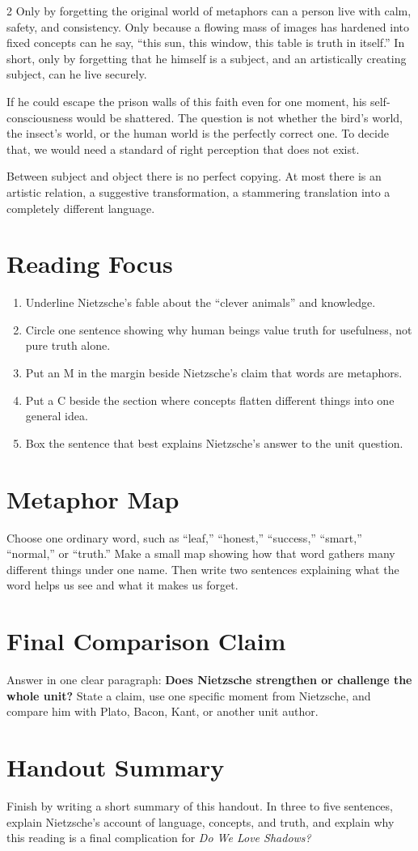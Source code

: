 \documentclass[12pt]{article}
\begin{document}
\begin{multicols}{2}
Only by forgetting the original world of metaphors can a person live with calm, safety, and consistency. Only because a flowing mass of images has hardened into fixed concepts can he say, ``this sun, this window, this table is truth in itself.'' In short, only by forgetting that he himself is a subject, and an artistically creating subject, can he live securely.

If he could escape the prison walls of this faith even for one moment, his self-consciousness would be shattered. The question is not whether the bird's world, the insect's world, or the human world is the perfectly correct one. To decide that, we would need a standard of right perception that does not exist.

Between subject and object there is no perfect copying. At most there is an artistic relation, a suggestive transformation, a stammering translation into a completely different language.

\section*{Reading Focus}
\begin{enumerate}[leftmargin=*, itemsep=0.2em]
\item Underline Nietzsche's fable about the ``clever animals'' and knowledge.
\item Circle one sentence showing why human beings value truth for usefulness, not pure truth alone.
\item Put an M in the margin beside Nietzsche's claim that words are metaphors.
\item Put a C beside the section where concepts flatten different things into one general idea.
\item Box the sentence that best explains Nietzsche's answer to the unit question.
\end{enumerate}

\section*{Metaphor Map}
Choose one ordinary word, such as ``leaf,'' ``honest,'' ``success,'' ``smart,'' ``normal,'' or ``truth.'' Make a small map showing how that word gathers many different things under one name. Then write two sentences explaining what the word helps us see and what it makes us forget.

\section*{Final Comparison Claim}
Answer in one clear paragraph: \textbf{Does Nietzsche strengthen or challenge the whole unit?} State a claim, use one specific moment from Nietzsche, and compare him with Plato, Bacon, Kant, or another unit author.

\section*{Handout Summary}
Finish by writing a short summary of this handout. In three to five sentences, explain Nietzsche's account of language, concepts, and truth, and explain why this reading is a final complication for \textit{Do We Love Shadows?}

\end{multicols}
\end{document}

